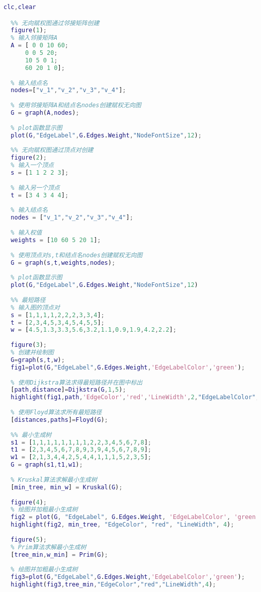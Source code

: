 \documentclass[withoutpreface]{cumcmthesis}
\begin{document}
  \begin{lstlisting}[language=matlab ,caption={示例代码} ]
  clc,clear

  %% 无向赋权图通过邻接矩阵创建
  figure(1);
  % 输入邻接矩阵A
  A = [ 0 0 10 60;
      0 0 5 20;
      10 5 0 1;
      60 20 1 0];	
      
  % 输入结点名
  nodes=["v_1","v_2","v_3","v_4"];
  
  % 使用邻接矩阵A和结点名nodes创建赋权无向图
  G = graph(A,nodes);
  
  % plot函数显示图
  plot(G,"EdgeLabel",G.Edges.Weight,"NodeFontSize",12);
  
  %% 无向赋权图通过顶点对创建
  figure(2);
  % 输入一个顶点
  s = [1 1 2 2 3];
  
  % 输入另一个顶点
  t = [3 4 3 4 4];
  
  % 输入结点名
  nodes = ["v_1","v_2","v_3","v_4"];
  
  % 输入权值
  weights = [10 60 5 20 1];
  
  % 使用顶点对s,t和结点名nodes创建赋权无向图
  G = graph(s,t,weights,nodes);
  
  % plot函数显示图
  plot(G,"EdgeLabel",G.Edges.Weight,"NodeFontSize",12)
  
  %% 最短路径
  % 输入图的顶点对
  s = [1,1,1,1,2,2,2,3,3,4];
  t = [2,3,4,5,3,4,5,4,5,5];
  w = [4.5,1.3,3.3,5.6,3.2,1.1,0.9,1.9,4.2,2.2];
  
  figure(3);
  % 创建并绘制图
  G=graph(s,t,w);
  fig1=plot(G,"EdgeLabel",G.Edges.Weight,'EdgeLabelColor','green');
  
  % 使用Dijkstra算法求得最短路径并在图中标出
  [path,distance]=Dijkstra(G,1,5);
  highlight(fig1,path,'EdgeColor','red','LineWidth',2,"EdgeLabelColor","red");
  
  % 使用Floyd算法求所有最短路径
  [distances,paths]=Floyd(G);
  
  %% 最小生成树
  s1 = [1,1,1,1,1,1,1,1,2,2,3,4,5,6,7,8];
  t1 = [2,3,4,5,6,7,8,9,3,9,4,5,6,7,8,9];
  w1 = [2,1,3,4,4,2,5,4,4,1,1,1,5,2,3,5];
  G = graph(s1,t1,w1);
  
  % Kruskal算法求解最小生成树
  [min_tree, min_w] = Kruskal(G);
  
  figure(4);
  % 绘图并加粗最小生成树
  fig2 = plot(G, "EdgeLabel", G.Edges.Weight, 'EdgeLabelColor', 'green');
  highlight(fig2, min_tree, "EdgeColor", "red", "LineWidth", 4);
  
  figure(5);
  % Prim算法求解最小生成树
  [tree_min,w_min] = Prim(G);
  
  % 绘图并加粗最小生成树
  fig3=plot(G,"EdgeLabel",G.Edges.Weight,'EdgeLabelColor','green');
  highlight(fig3,tree_min,"EdgeColor","red","LineWidth",4);
  \end{lstlisting}
\end{document}
